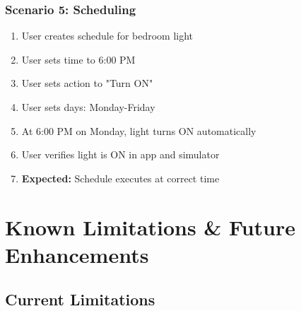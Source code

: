 \documentclass[12pt,a4paper]{article}
\begin{document}
\subsubsection{Scenario 5: Scheduling}
\begin{enumerate}
    \item User creates schedule for bedroom light
    \item User sets time to 6:00 PM
    \item User sets action to "Turn ON"
    \item User sets days: Monday-Friday
    \item At 6:00 PM on Monday, light turns ON automatically
    \item User verifies light is ON in app and simulator
    \item \textbf{Expected:} Schedule executes at correct time
\end{enumerate}


\newpage
\section{Known Limitations \& Future Enhancements}

\subsection{Current Limitations}
\end{document}
